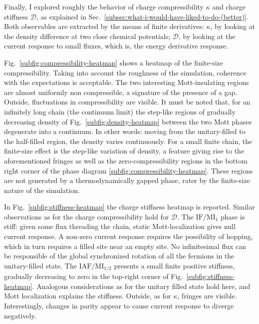 Finally, I explored roughly the behavior of charge compressibility $\kappa$ and charge stiffness $\mathcal{D}$, as explained in Sec.~\ref{subsec:what-i-would-have-liked-to-do-(better)}. Both observables are extracted by the means of finite derivatives: $\kappa$, by looking at the density difference at two close chemical potentials; $\mathcal{D}$, by looking at the current response to small fluxes, which is, the energy derivative response.

Fig.~\ref{subfig:compressibility-heatmap} shows a heatmap of the finite-size compressibility. Taking into account the roughness of the simulation, coherence with the expectations is acceptable. The two interesting Mott-insulating regions are almost uniformly non compressible, a signature of the presence of a gap. Outside, fluctuations in compressibility are visible. It must be noted that, for an infinitely long chain (the continuum limit) the step-like regions of gradually decreasing density of Fig.~\ref{subfig:density-heatmap} between the two Mott phases degenerate into a continuum. In other words: moving from the unitary-filled to the half-filled region, the density varies continuously. For a small finite chain, the finite-size effect is the step-like variation of density, a feature giving rise to the aforementioned fringes as well as the zero-compressibility regions in the bottom right corner of the phase diagram \ref{subfig:compressibility-heatmap}. These regions are not generated by a thermodynamically gapped phase, rater by the finite-size nature of the simulation.

In Fig.~\ref{subfig:stiffness-heatmap} the charge stiffness heatmap is reported. Similar observations as for the charge compressibility hold for $\mathcal{D}$. The $\mathrm{IF}/\mathrm{MI}_1$ phase is stiff: given some flux threading the chain, static Mott-localization gives null current response. A non-zero current response requires the possibility of hopping, which in turn requires a filled site near an empty site. No infinitesimal flux can be responsible of the global synchronized rotation of all the fermions in the unitary-filled state.
The $\mathrm{IAF}/\mathrm{MI}_{1/2}$ presents a small finite positive stiffness, gradually decreasing to zero in the top-right corner of Fig.~\ref{subfig:stiffness-heatmap}. Analogous considerations as for the unitary filled state hold here, and Mott localization explains the stiffness. Outside, as for $\kappa$, fringes are visible. Interestingly, changes in parity appear to cause current response to diverge negatively.

